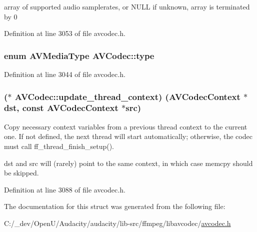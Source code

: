 array of supported audio samplerates, or N\+U\+LL if unknown, array is terminated by 0 



Definition at line 3053 of file avcodec.\+h.

\subsubsection[{\texorpdfstring{type}{type}}]{\setlength{\rightskip}{0pt plus 5cm}enum {\bf A\+V\+Media\+Type} A\+V\+Codec\+::type}\hypertarget{struct_a_v_codec_ab539ca86026d043803c24ba06fa84197}{}\label{struct_a_v_codec_ab539ca86026d043803c24ba06fa84197}


Definition at line 3044 of file avcodec.\+h.

\subsubsection[{\texorpdfstring{update\+\_\+thread\+\_\+context}{update_thread_context}}]{($\ast$ A\+V\+Codec\+::update\+\_\+thread\+\_\+context) ({\bf A\+V\+Codec\+Context} $\ast$dst, {\bf const} {\bf A\+V\+Codec\+Context} $\ast$src)}\hypertarget{struct_a_v_codec_a286e505d913763a6bb9ea2bfee00f2c3}{}\label{struct_a_v_codec_a286e505d913763a6bb9ea2bfee00f2c3}
Copy necessary context variables from a previous thread context to the current one. If not defined, the next thread will start automatically; otherwise, the codec must call ff\+\_\+thread\+\_\+finish\+\_\+setup().

dst and src will (rarely) point to the same context, in which case memcpy should be skipped. 

Definition at line 3088 of file avcodec.\+h.



The documentation for this struct was generated from the following file\+:\begin{DoxyCompactItemize}
\item 
C\+:/\+\_\+dev/\+Open\+U/\+Audacity/audacity/lib-\/src/ffmpeg/libavcodec/\hyperlink{avcodec_8h}{avcodec.\+h}\end{DoxyCompactItemize}
